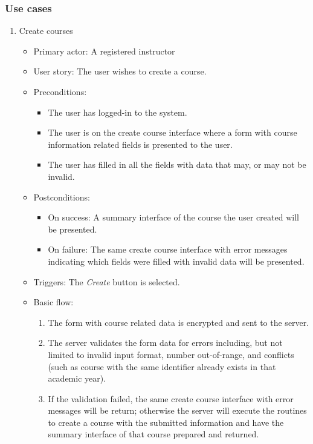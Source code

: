 \subsubsection{Use cases}
\begin{enumerate}
\item Create courses
\begin{itemize}
    \item Primary actor: A registered instructor
    \item User story: The user wishes to create a course.
    \item Preconditions: 
        \begin{itemize}
            \item The user has logged-in to the system.
            \item The user is on the create course interface where a form with
                course information related fields is presented to the user.
            \item The user has filled in all the fields with data that may, or
                may not be invalid.
        \end{itemize}
    \item Postconditions:
        \begin{itemize}
            \item On success: A summary interface of the course the user created
                will be presented.
            \item On failure: The same create course interface with error
                messages indicating which fields were filled with invalid data
                will be presented.
        \end{itemize}
    \item Triggers: The \emph{Create} button is selected.
    \item Basic flow:
        \begin{enumerate}
            \item The form with course related data is encrypted and sent to
                the server.
            \item The server validates the form data for errors including,
                but not limited to invalid input format, number out-of-range,
                and conflicts (such as course with the same identifier  
                already exists in that academic year).
            \item If the validation failed, the same create course interface
                with error messages will be return; otherwise the server will
                execute the routines to create a course with the submitted 
                information and have the summary interface of that course prepared
                and returned.
        \end{enumerate}
\end{itemize}


\end{enumerate}
